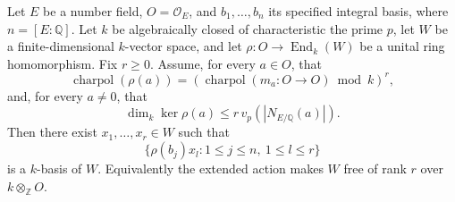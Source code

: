 \begin{srproposition}\label{prop:faithful-kernel-norm-free}
Let \(E\) be a number field, \(O=\mathcal O_E\), and
\(b_1,\ldots,b_n\) its specified integral basis, where
\(n=[E:\mathbb Q]\).  Let \(k\) be algebraically closed of
characteristic the prime \(p\), let \(W\) be a finite-dimensional
\(k\)-vector space, and let
\(\rho:O\to\operatorname{End}_k(W)\) be a unital ring homomorphism.
Fix \(r\ge0\).  Assume, for every \(a\in O\), that
\[
 \operatorname{charpol}(\rho(a))
  =\left(\operatorname{charpol}(m_a:O\to O)
                                \bmod k\right)^r,
 \tag{NF1}\label{eq:faithful-norm-free-charpoly}
\]
and, for every \(a\ne0\), that
\[
       \dim_k\ker\rho(a)\le
                       r\,v_p(|N_{E/\mathbb Q}(a)|).
 \tag{NF2}\label{eq:faithful-norm-free-kernel}
\]
Then there exist \(x_1,\ldots,x_r\in W\) such that
\[
        \{\rho(b_j)x_l:1\le j\le n,\ 1\le l\le r\}
 \tag{NF3}\label{eq:faithful-norm-free-basis}
\]
is a \(k\)-basis of \(W\).  Equivalently the extended action makes
\(W\) free of rank \(r\) over \(k\otimes_{\mathbb Z}O\).
\end{srproposition}


